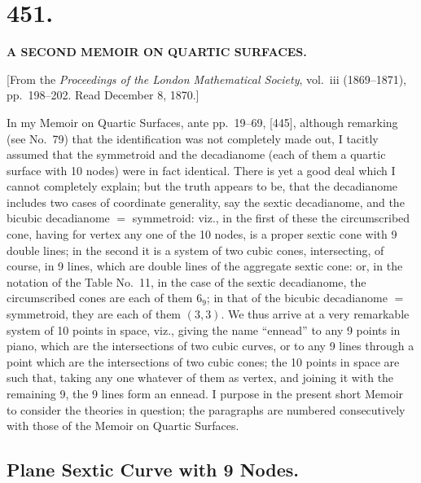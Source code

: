 \documentclass[11pt,a4paper]{article}
\begin{document}
\clearpage

\section*{\textbf{451.}}

\begin{center}
\textbf{A SECOND MEMOIR ON QUARTIC SURFACES.}
\end{center}

[From the \textit{Proceedings of the London Mathematical Society}, vol.~iii (1869--1871), pp.~198--202. Read December 8, 1870.]

In my Memoir on Quartic Surfaces, ante pp.~19--69, [445], although remarking (see No.~79) that the identification was not completely made out, I tacitly assumed that the symmetroid and the decadianome (each of them a quartic surface with 10 nodes) were in fact identical. There is yet a good deal which I cannot completely explain; but the truth appears to be, that the decadianome includes two cases of coordinate generality, say the sextic decadianome, and the bicubic decadianome $=$ symmetroid: viz., in the first of these the circumscribed cone, having for vertex any one of the 10 nodes, is a proper sextic cone with 9 double lines; in the second it is a system of two cubic cones, intersecting, of course, in 9 lines, which are double lines of the aggregate sextic cone: or, in the notation of the Table No.~11, in the case of the sextic decadianome, the circumscribed cones are each of them $6_9$; in that of the bicubic decadianome $=$ symmetroid, they are each of them $(3, 3)$. We thus arrive at a very remarkable system of 10 points in space, viz., giving the name ``ennead'' to any 9 points in piano, which are the intersections of two cubic curves, or to any 9 lines through a point which are the intersections of two cubic cones; the 10 points in space are such that, taking any one whatever of them as vertex, and joining it with the remaining 9, the 9 lines form an ennead. I purpose in the present short Memoir to consider the theories in question; the paragraphs are numbered consecutively with those of the Memoir on Quartic Surfaces.

\subsection*{Plane Sextic Curve with 9 Nodes.}
\end{document}
